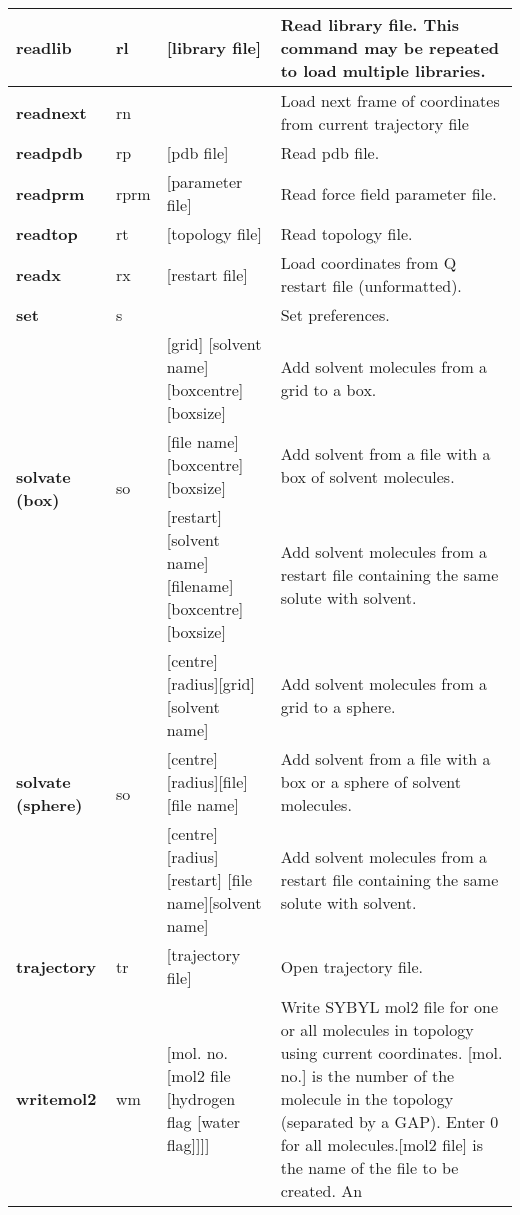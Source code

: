 \documentclass[a4paper,11pt]{article}
\begin{document}
\begin{longtable}{|p{58pt}|p{27pt}|p{110pt}|p{170pt}|}
\hline \bf{readlib}     & rl & [library file]      & Read library file. This command may be repeated to load
                                                     multiple libraries.  \\
\hline \bf{readnext}    & rn &                     & Load next frame of coordinates from current trajectory file\\
\hline \bf{readpdb}     & rp & [pdb file]          & Read pdb file. \\
\hline \bf{readprm}     & rprm & [parameter file]   &  Read force field parameter file. \\
\hline \bf{readtop}     & rt & [topology file]     & Read topology file. \\
\hline \bf{readx}       & rx & [restart file]      & Load coordinates from Q restart file (unformatted).\\
\hline \bf{set}         & s  &                     & Set preferences.  \\
\hline \multirow{3}{58pt}{\bf{solvate (box)}} & \multirow{3}{27pt}{so} & [grid] [solvent name] [boxcentre] [boxsize]
& Add solvent molecules from a grid to a box. \\
\cline{3-4}             &    & [file name] [boxcentre] [boxsize] & Add solvent from a file with a box of solvent molecules.\\
\cline{3-4}             &    & [restart] [solvent
name][filename][boxcen\-tre][boxsize] & Add solvent molecules from a
restart file containing the same solute with solvent.\\
\hline \multirow{3}{58pt}{\bf{solvate (sphere)}} &
\multirow{3}{27pt}{so} & [centre][radius][grid]
[solvent name] & Add solvent molecules from a grid to a sphere.\\
\cline{3-4} &  & [centre][radius][file][file name]                  & Add solvent from a file with a box or a sphere of solvent molecules.\\
\cline{3-4} &  & [centre][radius][restart]
[file name][solvent name] & Add solvent molecules from a restart file containing the same solute with solvent.\\
\hline \bf{trajectory}    & tr & [trajectory file]      & Open trajectory file.\\
\hline \bf{writemol2} & wm & [mol. no. [mol2 file [hydrogen flag
[water flag]]]] & Write SYBYL mol2 file for one or all molecules
in topology using current coordinates. [mol. no.] is the number of
the molecule in the topology (separated by a GAP). Enter 0 for all
molecules.[mol2 file] is the name of the file to be created. An

\end{longtable}
\end{document}
